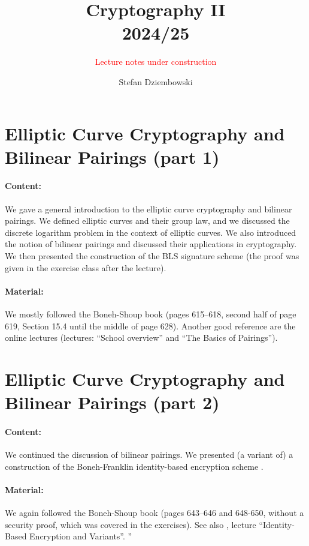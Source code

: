\documentclass{llncs}
\title{Cryptography II\\ 2024/25}
\subtitle{\textcolor{red}{Lecture notes under construction}}
\author{Stefan Dziembowski}
\institute{University of Warsaw}
\begin{document}
\maketitle

\section{Elliptic Curve Cryptography and Bilinear Pairings (part 1)}


\paragraph{Content:} We gave a general introduction to the elliptic curve cryptography and bilinear pairings. We defined elliptic curves and their group law, and we discussed the discrete logarithm problem in the context of elliptic curves. We also introduced the notion of bilinear pairings and discussed their applications in cryptography. We then presented the construction of the BLS signature scheme \cite{Boneh2001} (the proof was given in the exercise class after the lecture). 

\paragraph{Material:} We mostly followed the Boneh-Shoup book \cite{Boneh2023} (pages 615--618, second half of page 619, Section 15.4 until the middle of page 628). Another good reference are the online lectures \cite{WinterSchool} (lectures: ``School overview'' and ``The Basics of Pairings'').



\section{Elliptic Curve Cryptography and Bilinear Pairings (part 2)}


\paragraph{Content:} We continued the discussion of bilinear pairings. We presented (a variant of) a construction of the Boneh-Franklin identity-based encryption scheme \cite{Boneh2003}.

\paragraph{Material:} We again followed the Boneh-Shoup book \cite{Boneh2023} (pages 643--646 and 648-650, without a security proof, which was covered in the exercises). See also \cite{WinterSchool}, lecture ``Identity-Based Encryption and Variants''.
''
\end{document}
